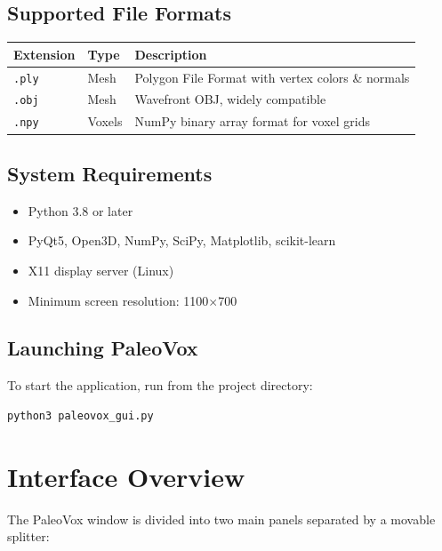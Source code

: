 \documentclass[12pt,a4paper]{article}
\begin{document}
\subsection{Supported File Formats}

\begin{table}[H]
\centering
\begin{tabular}{llp{7cm}}
\toprule
\textbf{Extension} & \textbf{Type} & \textbf{Description} \\
\midrule
\texttt{.ply} & Mesh & Polygon File Format with vertex colors \& normals \\
\texttt{.obj} & Mesh & Wavefront OBJ, widely compatible \\
\texttt{.npy}  & Voxels & NumPy binary array format for voxel grids \\
\bottomrule
\end{tabular}
\end{table}

\subsection{System Requirements}
\begin{itemize}
  \item Python 3.8 or later
  \item PyQt5, Open3D, NumPy, SciPy, Matplotlib, scikit-learn
  \item X11 display server (Linux)
  \item Minimum screen resolution: 1100$\times$700
\end{itemize}

\subsection{Launching PaleoVox}
To start the application, run from the project directory:
\begin{lstlisting}[language=bash]
python3 paleovox_gui.py
\end{lstlisting}

\newpage

\section{Interface Overview}

The PaleoVox window is divided into two main panels separated by a movable splitter:
\end{document}
